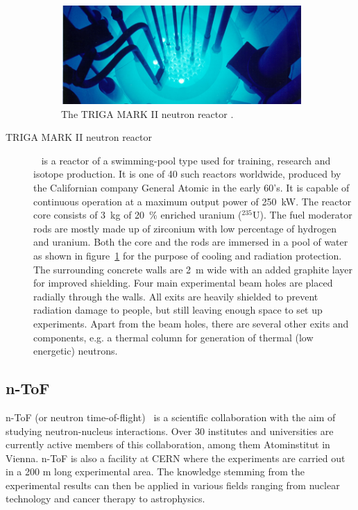 \begin{description}
\begin{figure}[!t]
\centering
\includegraphics[width=0.9\textwidth]{01_introduction/pics/triga}
\caption{The TRIGA MARK II neutron reactor \cite{GeneralAtomics}.}
\label{fig:triga}
\end{figure}
\item[TRIGA MARK II neutron reactor]~\cite{Triga:00000} is a reactor of a swimming-pool type used for training, research and isotope production. It is one of 40 such reactors worldwide, produced by the Californian company General Atomic in the early 60's. It is capable of continuous operation at a maximum output power of 250~kW. 
The reactor core consists of 3~kg of 20~\% enriched uranium ($^{235}$U). The fuel moderator rods are mostly made up of zirconium with low percentage of hydrogen and uranium. Both the core and the rods are immersed in a pool of water as shown in figure~\ref{fig:triga} for the purpose of cooling and radiation protection. The surrounding concrete walls are 2~m wide with an added graphite layer for improved shielding. Four main experimental beam holes are placed radially through the walls. All exits are heavily shielded to prevent radiation damage to people, but still leaving enough space to set up experiments. Apart from the beam holes, there are several other exits and components, e.g. a thermal column for generation of thermal (low energetic) neutrons.


\end{description}




\subsection{n-ToF}
n-ToF (or neutron time-of-flight)~\cite{NTOF:00000} is a scientific collaboration with the aim of studying neutron-nucleus interactions. Over 30 institutes and universities are currently active members of this collaboration, among them Atominstitut in Vienna. n-ToF is also a facility at CERN where the experiments are carried out in a 200 m long experimental area. The knowledge stemming from the experimental results can then be applied in various fields ranging from nuclear technology and cancer therapy to astrophysics.

